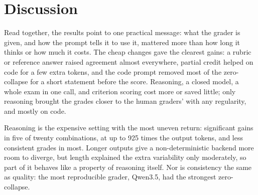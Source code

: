 
\section{Discussion}
\label{sec:discussion}

Read together, the results point to one practical message: what the grader is given, and how the prompt tells it
to use it, mattered more than how long it thinks or how much it costs. The cheap changes gave the clearest gains:
a rubric or reference answer raised agreement almost everywhere, partial credit helped on code for a few extra
tokens, and the code prompt removed most of the zero-collapse for a short statement before the score. Reasoning,
a closed model, a whole exam in one call, and criterion scoring cost more or saved little; only reasoning brought
the grades closer to the human graders' with any regularity, and mostly on code.

Reasoning is the expensive setting with the most uneven return: significant gains in five of twenty
combinations, at up to 925 times the output tokens, and less consistent grades in most. Longer outputs give a
non-deterministic backend more room to diverge, but length explained the extra variability only moderately, so
part of it behaves like a property of reasoning itself. Nor is consistency the same as quality: the most
reproducible grader, Qwen3.5, had the strongest zero-collapse.


